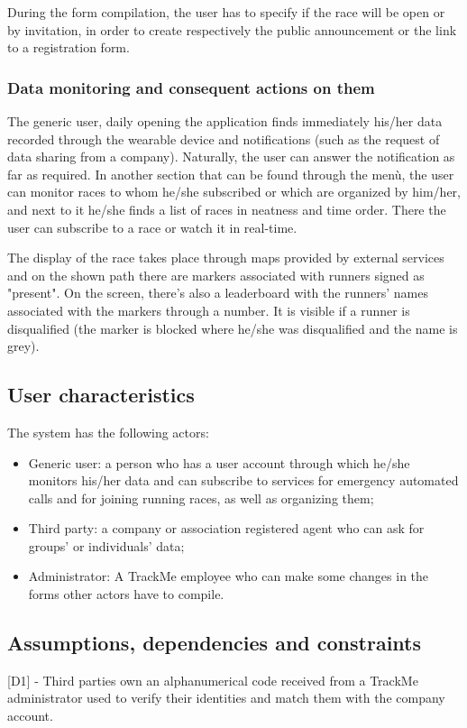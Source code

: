 During the form compilation, the user has to specify if the race will be open or by invitation, in order to create respectively the public announcement or the link to a registration form.
 
\subsubsection{Data monitoring and consequent actions on them}

The generic user, daily opening the application finds immediately his/her data recorded through the wearable device and notifications (such as the request of data sharing from a company). Naturally, the user can answer the notification as far as required. In another section that can be found through the menù, the user can monitor races to whom he/she subscribed or which are organized by him/her, and next to it he/she finds a list of races in neatness and time order. There the user can subscribe to a race or watch it in real-time.

The display of the race takes place through maps provided by external services and on the shown path there are markers associated with runners signed as "present". On the screen, there's also a leaderboard with the runners' names associated with the markers through a number. It is visible if a runner is disqualified (the marker is blocked where he/she was disqualified and the name is grey).
 
\subsection{User characteristics}
The system has the following actors:
\begin{itemize}
\item Generic user: a person who has a user account through which he/she monitors his/her data and can subscribe to services for emergency automated calls and for joining running races, as well as organizing them;
\item Third party: a company or association registered agent who can ask for groups' or individuals' data;
\item Administrator: A TrackMe employee who can make some changes in the forms other actors have to compile.
\end{itemize}

\subsection{Assumptions, dependencies and constraints}
[D1] - Third parties own an alphanumerical code received from a TrackMe administrator used to verify their identities and match them with the company account. \newline


